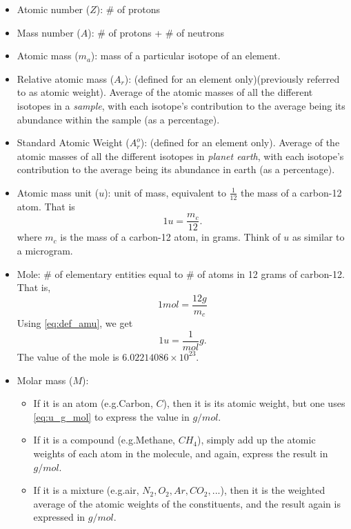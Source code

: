 \documentclass[../hedp.tex]{subfiles}
\begin{document}
\begin{itemize}

\item Atomic number ($Z$): \# of protons

\item Mass number ($A$): \# of protons + \# of neutrons

\item Atomic mass ($m_a$): mass of a particular isotope of an element.

\item Relative atomic mass ($A_r$): (defined for an element only)(previously referred to as atomic weight). Average of the atomic masses of all the different isotopes in a \textit{sample}, with each isotope's contribution to the average being its abundance within the sample (as a percentage).

\item Standard Atomic Weight ($A_r^o$): (defined for an element only). Average of the atomic masses of all the different isotopes in \textit{planet earth}, with each isotope's contribution to the average being its abundance in earth (as a percentage).

\item Atomic mass unit ($u$): unit of mass, equivalent to $\frac{1}{12}$ the mass of a carbon-12 atom. That is 
\begin{equation}
\label{eq:def_amu}
1u = \frac{m_c}{12}.
\end{equation}
where $m_c$ is the mass of a carbon-12 atom, in grams. Think of $u$ as similar to a microgram.

\item Mole: \# of elementary entities equal to \# of atoms in 12 grams of carbon-12. That is,
\begin{equation}
1 mol = \frac{12g}{m_c}
\end{equation}
Using \cref{eq:def_amu}, we get
\begin{equation}
\label{eq:u_g_mol}
1u = \frac{1}{mol} g.
\end{equation}
The value of the mole is $6.02214086 \times 10^{23}$.

\item Molar mass ($M$): 
\begin{itemize}
    \item If it is an atom (e.g.\@ Carbon, $C$), then it is its atomic weight, but one uses \cref{eq:u_g_mol} to express the value in $g/mol$. 
    \item If it is a compound (e.g.\@ Methane, $CH_4$), simply add up the atomic weights of each atom in the molecule, and again, express the result in $g/mol$.
    \item If it is a mixture (e.g.\@ air, $N_2,O_2,Ar,CO_2,...$), then it is the weighted average of the atomic weights of the constituents, and the result again is expressed in $g/mol$.
\end{itemize}


\end{itemize}
\end{document}
